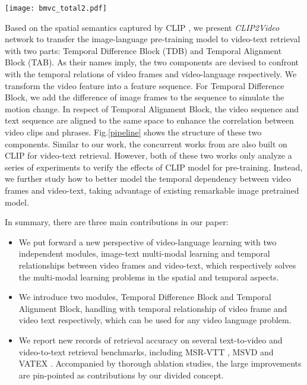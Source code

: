 \documentclass[final]{cvpr}
\begin{document}
\begin{figure*}
        \begin{center}
            \texttt{[image: bmvc\_total2.pdf]}
        \end{center}
\caption{Overview of CLIP2Video. It consists of two key components: Temporal Difference Block (TDB), which is used to enhance temporal interaction between frames; Temporal Alignment Block (TAB), which is adopted to align video clips and contextual words in the same space, capturing the motion change by cross-modal understanding.
        }
        \label{pipeline}        
\end{figure*}


Based on the spatial semantics captured by CLIP \cite{radford2021learning}, we present \textit{CLIP2Video} network to transfer the image-language pre-training model to video-text retrieval with two parts: Temporal Difference Block (TDB) and Temporal Alignment Block (TAB). As their names imply, the two components are devised to confront with the temporal relations of video frames and video-language respectively. We transform the video feature into a feature sequence. For Temporal Difference Block, we add the difference of image frames to the sequence to simulate the motion change. In respect of Temporal Alignment Block, the video sequence and text sequence are aligned to the same space to enhance the correlation between video clips and phrases. Fig.\ref{pipeline} shows the structure of these two components. Similar to our work, the concurrent works from \cite{portillo2021straightforward,luo2021clip4clip} are also built on CLIP for video-text retrieval. However, both of these two works only analyze a series of experiments to verify the effects of CLIP model for pre-training. Instead, we further study how to better model the temporal dependency between video frames and video-text, taking advantage of existing remarkable image pretrained model. 


In summary, there are three main contributions in our paper: 
\begin{itemize}
    \item We put forward a new perspective of video-language learning with two independent modules, image-text multi-modal learning and temporal relationships between video frames and video-text, which respectively solves the multi-modal learning problems in the spatial and temporal aspects. 
    \item We introduce two modules, Temporal Difference Block and Temporal Alignment Block,  handling with temporal relationship of video frame and video text respectively, which can be used for any video language problem.
    \item We report new records of retrieval accuracy on several text-to-video and video-to-text retrieval benchmarks, including MSR-VTT \cite{xu2016msr}, MSVD \cite{chen2011collecting} and VATEX \cite{wang2019vatex}. Accompanied by thorough ablation studies, the large improvements are pin-pointed as contributions by our divided concept.
\end{itemize}
\end{document}
